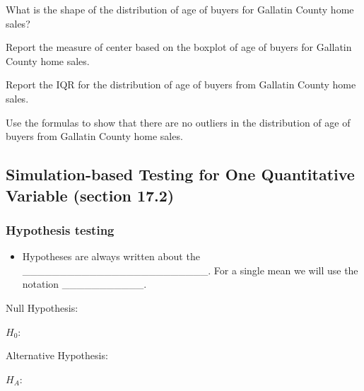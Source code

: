 \documentclass[
]{report}
\providecommand{\tightlist}{%
  \setlength{\itemsep}{0pt}\setlength{\parskip}{0pt}}
\begin{document}
What is the shape of the distribution of age of buyers for Gallatin County home sales?

\vspace{0.3in}

Report the measure of center based on the boxplot of age of buyers for Gallatin County home sales.

\vspace{0.3in}

Report the IQR for the distribution of age of buyers from Gallatin County home sales.

\vspace{0.3in}

Use the formulas to show that there are no outliers in the distribution of age of buyers from Gallatin County home sales.

\vspace{0.8in}

\subsection*{Simulation-based Testing for One Quantitative Variable (section 17.2)}\label{simulation-based-testing-for-one-quantitative-variable-section-17.2}


\subsubsection*{Hypothesis testing}\label{hypothesis-testing-1}


\begin{itemize}
\tightlist
\item
  Hypotheses are always written about the \_\_\_\_\_\_\_\_\_\_\_\_\_\_\_\_\_\_\_\_\_\_\_\_\_. For a single mean we will use the notation \_\_\_\_\_\_\_\_\_\_\_.
\end{itemize}


Null Hypothesis:

\(H_0:\)

\vspace{0.2in}

Alternative Hypothesis:

\(H_A:\)

\vspace{0.2in}
\end{document}
